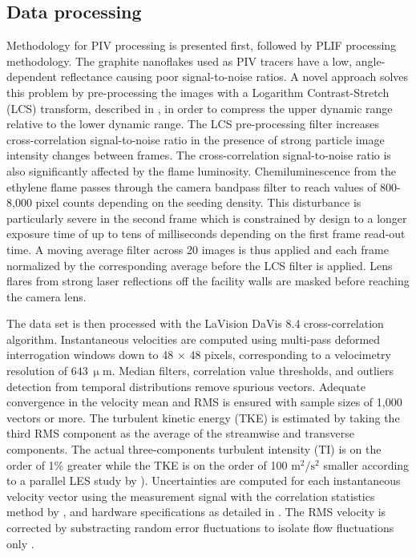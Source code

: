 \subsection*{Data processing}
Methodology for PIV processing is presented first, followed by PLIF processing methodology. The graphite nanoflakes used as PIV tracers have a low, angle-dependent reflectance causing poor signal-to-noise ratios. A novel approach solves this problem by pre-processing the images with a Logarithm Contrast-Stretch (LCS) transform, described in \cite{LieberThesis}, in order to compress the upper dynamic range relative to the lower dynamic range. The LCS pre-processing filter increases cross-correlation signal-to-noise ratio in the presence of strong particle image intensity changes between frames. 
The cross-correlation signal-to-noise ratio is also significantly affected by the flame luminosity. Chemiluminescence from the ethylene flame passes through the camera bandpass filter to reach values of 800-8,000 pixel counts depending on the seeding density. This disturbance is particularly severe in the second frame which is constrained by design to a longer exposure time of up to tens of milliseconds depending on the first frame read-out time. A moving average filter across 20 images is thus applied and each frame normalized by the corresponding average before the LCS filter is applied. Lens flares from strong laser reflections off the facility walls are masked before reaching the camera lens.

The data set is then processed with the LaVision DaVis 8.4 cross-correlation algorithm. 
Instantaneous velocities are computed using multi-pass deformed interrogation windows down to 48 $\times$ 48 pixels, corresponding to a velocimetry resolution of $643~ \mathrm{\upmu m}$. Median filters, correlation value thresholds, and outliers detection from temporal distributions remove spurious vectors. Adequate convergence in the velocity mean and RMS is ensured with sample sizes of 1,000 vectors or more. The turbulent kinetic energy (TKE) is estimated by taking the third RMS component as the average of the streamwise and transverse components. The actual three-components turbulent intensity (TI) is on the order of 1\% greater while the TKE is on the order of 100 $\mathrm{m^2/s^2}$ smaller according to a parallel LES study by \cite{Nielsen2019}).
Uncertainties are computed for each instantaneous velocity vector using the measurement signal with the correlation statistics method by \cite{Wieneke2015}, and hardware specifications as detailed in \cite{LieberThesis}. The RMS velocity is corrected by substracting random error fluctuations to isolate flow fluctuations only \citep{SciacchitanoWieneke2016}. 

